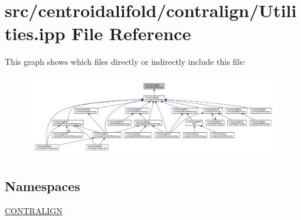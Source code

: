 \hypertarget{centroidalifold_2contralign_2_utilities_8ipp}{\section{src/centroidalifold/contralign/\+Utilities.ipp File Reference}
\label{centroidalifold_2contralign_2_utilities_8ipp}
}
This graph shows which files directly or indirectly include this file\+:
\nopagebreak
\begin{figure}[H]
\begin{center}
\leavevmode
\includegraphics[width=350pt]{centroidalifold_2contralign_2_utilities_8ipp__dep__incl}
\end{center}
\end{figure}
\subsection*{Namespaces}
\begin{DoxyCompactItemize}
\item 
 \hyperlink{namespace_c_o_n_t_r_a_l_i_g_n}{C\+O\+N\+T\+R\+A\+L\+I\+G\+N}
\end{DoxyCompactItemize}
